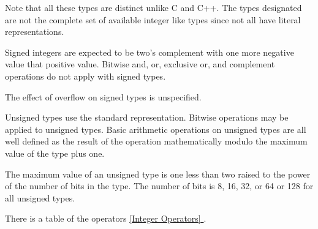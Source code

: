 \documentclass[oneside]{book}
\newcommand*{\fullref}[1]{\hyperref[{#1}]{\autoref*{#1} \nameref*{#1}}}
\begin{document}
{Note that all these types are distinct unlike C and C++.
The types designated are not the complete set of available
integer like types since not all have literal representations.

Signed integers are expected to be two's complement with one
more negative value that positive value. Bitwise and,
or, exclusive or, and complement operations do not apply
with signed types.

The effect of overflow on signed types is unspecified.

Unsigned types use the standard representation. 
Bitwise operations may be applied to unsigned types.
Basic arithmetic operations on unsigned types are
all well defined as the result of the operation
mathematically modulo the maximum value of the type
plus one.

The maximum value of an unsigned type is one less than
two raised to the power of the number of bits in the type.
The number of bits is 8, 16, 32, or 64 or 128 for all unsigned types.

There is a table of the operators \fullref{Integer Operators}.

}
\end{document}
